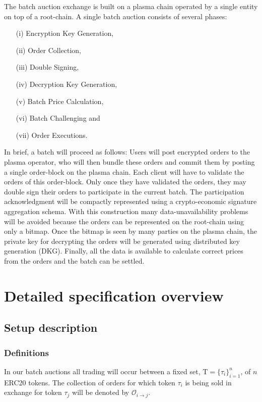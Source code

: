 \documentclass[11pt,parskip=full]{scrartcl}%
\newcommand{\Tau}{\mathrm{T}}
\def\pO{\mathcal{O}}
\def\ra{\rightarrow}
\newcommand*{\erc}{ERC20 }
\begin{document}
The batch auction exchange is built on a plasma chain operated by a single entity on top of a root-chain. A single batch auction consists of several phases:
\begin{itemize}
\item[(i)] Encryption Key Generation, 
\item[(ii)] Order Collection, 
\item[(iii)] Double Signing, 
\item[(iv)] Decryption Key Generation,
\item[(v)] Batch Price Calculation,
\item[(vi)] Batch Challenging and 
\item[(vii)] Order Executions. 

\end{itemize}
In brief, a batch will proceed as follows: Users will post encrypted orders to the plasma operator, who will then bundle these orders and commit them by posting a single order-block on the plasma chain. Each client will have to validate the orders of this order-block. Only once they have validated the orders, they may double sign their orders to participate in the current batch. The participation acknowledgment will be compactly represented using a crypto-economic signature aggregation schema. With this construction many data-unavailability problems will be avoided because the orders can be represented on the root-chain using only a bitmap.
Once the bitmap is seen by many parties on the plasma chain, the private key for decrypting the orders will be generated using distributed key generation (DKG). Finally, all the data is available to calculate correct prices from the orders and the batch can be settled. 


\newpage

\section{Detailed specification overview}
\subsection{Setup description}

\subsubsection{Definitions}


In our batch auctions all trading will occur between a fixed set, $\Tau = \{\tau_i\}_{i=1}^n$, of $n$ \erc tokens. The collection of orders for which token $\tau_i$ is being sold in exchange for token $\tau_j$ will be denoted by $\pO_{i\ra j}$. 
\end{document}
